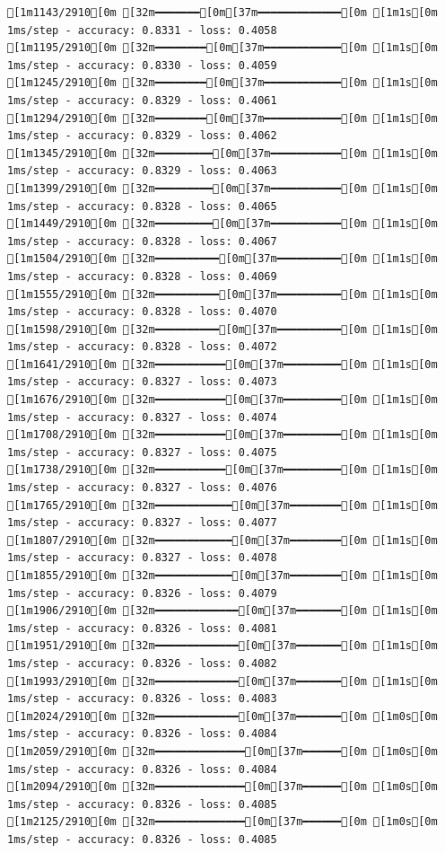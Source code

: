 \documentclass[
  letterpaper,
  DIV=11,
  numbers=noendperiod]{scrartcl}
\begin{document}
\begin{verbatim}
[1m1143/2910[0m [32m━━━━━━━[0m[37m━━━━━━━━━━━━━[0m [1m1s[0m 1ms/step - accuracy: 0.8331 - loss: 0.4058
[1m1195/2910[0m [32m━━━━━━━━[0m[37m━━━━━━━━━━━━[0m [1m1s[0m 1ms/step - accuracy: 0.8330 - loss: 0.4059
[1m1245/2910[0m [32m━━━━━━━━[0m[37m━━━━━━━━━━━━[0m [1m1s[0m 1ms/step - accuracy: 0.8329 - loss: 0.4061
[1m1294/2910[0m [32m━━━━━━━━[0m[37m━━━━━━━━━━━━[0m [1m1s[0m 1ms/step - accuracy: 0.8329 - loss: 0.4062
[1m1345/2910[0m [32m━━━━━━━━━[0m[37m━━━━━━━━━━━[0m [1m1s[0m 1ms/step - accuracy: 0.8329 - loss: 0.4063
[1m1399/2910[0m [32m━━━━━━━━━[0m[37m━━━━━━━━━━━[0m [1m1s[0m 1ms/step - accuracy: 0.8328 - loss: 0.4065
[1m1449/2910[0m [32m━━━━━━━━━[0m[37m━━━━━━━━━━━[0m [1m1s[0m 1ms/step - accuracy: 0.8328 - loss: 0.4067
[1m1504/2910[0m [32m━━━━━━━━━━[0m[37m━━━━━━━━━━[0m [1m1s[0m 1ms/step - accuracy: 0.8328 - loss: 0.4069
[1m1555/2910[0m [32m━━━━━━━━━━[0m[37m━━━━━━━━━━[0m [1m1s[0m 1ms/step - accuracy: 0.8328 - loss: 0.4070
[1m1598/2910[0m [32m━━━━━━━━━━[0m[37m━━━━━━━━━━[0m [1m1s[0m 1ms/step - accuracy: 0.8328 - loss: 0.4072
[1m1641/2910[0m [32m━━━━━━━━━━━[0m[37m━━━━━━━━━[0m [1m1s[0m 1ms/step - accuracy: 0.8327 - loss: 0.4073
[1m1676/2910[0m [32m━━━━━━━━━━━[0m[37m━━━━━━━━━[0m [1m1s[0m 1ms/step - accuracy: 0.8327 - loss: 0.4074
[1m1708/2910[0m [32m━━━━━━━━━━━[0m[37m━━━━━━━━━[0m [1m1s[0m 1ms/step - accuracy: 0.8327 - loss: 0.4075
[1m1738/2910[0m [32m━━━━━━━━━━━[0m[37m━━━━━━━━━[0m [1m1s[0m 1ms/step - accuracy: 0.8327 - loss: 0.4076
[1m1765/2910[0m [32m━━━━━━━━━━━━[0m[37m━━━━━━━━[0m [1m1s[0m 1ms/step - accuracy: 0.8327 - loss: 0.4077
[1m1807/2910[0m [32m━━━━━━━━━━━━[0m[37m━━━━━━━━[0m [1m1s[0m 1ms/step - accuracy: 0.8327 - loss: 0.4078
[1m1855/2910[0m [32m━━━━━━━━━━━━[0m[37m━━━━━━━━[0m [1m1s[0m 1ms/step - accuracy: 0.8326 - loss: 0.4079
[1m1906/2910[0m [32m━━━━━━━━━━━━━[0m[37m━━━━━━━[0m [1m1s[0m 1ms/step - accuracy: 0.8326 - loss: 0.4081
[1m1951/2910[0m [32m━━━━━━━━━━━━━[0m[37m━━━━━━━[0m [1m1s[0m 1ms/step - accuracy: 0.8326 - loss: 0.4082
[1m1993/2910[0m [32m━━━━━━━━━━━━━[0m[37m━━━━━━━[0m [1m1s[0m 1ms/step - accuracy: 0.8326 - loss: 0.4083
[1m2024/2910[0m [32m━━━━━━━━━━━━━[0m[37m━━━━━━━[0m [1m0s[0m 1ms/step - accuracy: 0.8326 - loss: 0.4084
[1m2059/2910[0m [32m━━━━━━━━━━━━━━[0m[37m━━━━━━[0m [1m0s[0m 1ms/step - accuracy: 0.8326 - loss: 0.4084
[1m2094/2910[0m [32m━━━━━━━━━━━━━━[0m[37m━━━━━━[0m [1m0s[0m 1ms/step - accuracy: 0.8326 - loss: 0.4085
[1m2125/2910[0m [32m━━━━━━━━━━━━━━[0m[37m━━━━━━[0m [1m0s[0m 1ms/step - accuracy: 0.8326 - loss: 0.4085

\end{verbatim}
\end{document}
